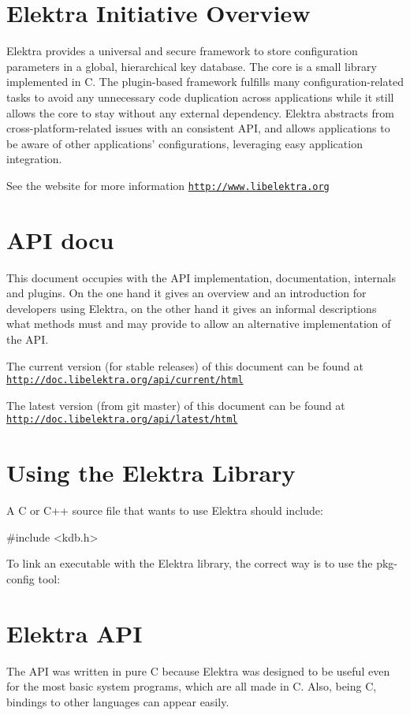 \hypertarget{index_overview}{}\section{Elektra Initiative Overview}\label{index_overview}
Elektra provides a universal and secure framework to store configuration parameters in a global, hierarchical key database. The core is a small library implemented in C. The plugin-\/based framework fulfills many configuration-\/related tasks to avoid any unnecessary code duplication across applications while it still allows the core to stay without any external dependency. Elektra abstracts from cross-\/platform-\/related issues with an consistent A\-P\-I, and allows applications to be aware of other applications' configurations, leveraging easy application integration.

See the website for more information \href{http://www.libelektra.org}{\tt http\-://www.\-libelektra.\-org}\hypertarget{index_focus}{}\section{A\-P\-I docu}\label{index_focus}
This document occupies with the A\-P\-I implementation, documentation, internals and plugins. On the one hand it gives an overview and an introduction for developers using Elektra, on the other hand it gives an informal descriptions what methods must and may provide to allow an alternative implementation of the A\-P\-I.

The current version (for stable releases) of this document can be found at \href{http://doc.libelektra.org/api/current/html}{\tt http\-://doc.\-libelektra.\-org/api/current/html}

The latest version (from git master) of this document can be found at \href{http://doc.libelektra.org/api/latest/html}{\tt http\-://doc.\-libelektra.\-org/api/latest/html}\hypertarget{index_using}{}\section{Using the Elektra Library}\label{index_using}
A C or C++ source file that wants to use Elektra should include\-: 
\begin{DoxyCode}
\textcolor{preprocessor}{#include <kdb.h>}
\end{DoxyCode}


To link an executable with the Elektra library, the correct way is to use the {\ttfamily pkg-\/config} tool\-: 
\hypertarget{index_classes}{}\section{Elektra A\-P\-I}\label{index_classes}
The A\-P\-I was written in pure C because Elektra was designed to be useful even for the most basic system programs, which are all made in C. Also, being C, bindings to other languages can appear easily.

